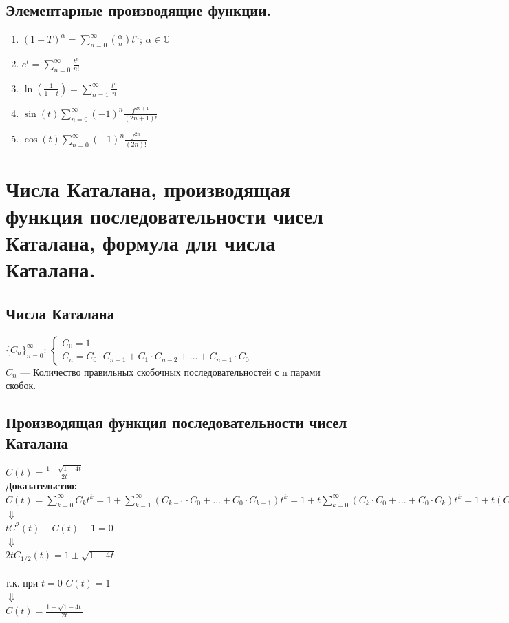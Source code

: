 \documentclass[12pt]{article}
\begin{document}
\subsection{Элементарные производящие функции.}
	\begin{enumerate}
	\item $ \displaystyle  (1+T)^\alpha = \sum_{n=0}^\infty \binom{\alpha}{n} t^n$; \quad $\alpha \in \mathbb C$
	\item $ \displaystyle  e^t = \sum_{n=0}^\infty \frac{t^n}{n!} $
	\item $ \displaystyle \ln\left(\frac{1}{1-t}\right) = \sum_{n=1}^\infty \frac{t^n}{n} $
	\item $ \displaystyle  \sin(t) \sum_{n=0}^\infty (-1)^n \frac{f^{2n+1}}{(2n+1)!} $
	\item $ \displaystyle  \cos(t) \sum_{n=0}^\infty (-1)^n \frac{f^{2n}}{(2n)!} $
\end{enumerate}

\section{Числа Каталана, производящая функция последовательности чисел Каталана, формула для числа Каталана.}
\subsection{Числа Каталана}
	$\{C_n\}_{n=0}^\infty$:
	$\begin{cases}
			C_0 = 1\\
			C_n = C_0 \cdot C_{n-1} + C_1\cdot C_{n-2}+ \ldots +C_{n-1}\cdot C_0
		\end{cases}$\\
	$C_n$ — Количество правильных скобочных последовательностей с n парами скобок.\\
\subsection{Производящая функция последовательности чисел Каталана}
	$C(t) = \frac{1-\sqrt{1-4t}}{2t}$\\
	\textbf{Доказательство:}\\
		$C(t) = \displaystyle\sum_{k=0}^\infty C_k t^k = 1 + \sum_{k=1}^\infty(C_{k-1} \cdot C_0 + \ldots + C_0 \cdot C_{k-1})t^k =
		1 + t\sum_{k=0}^\infty(C_{k} \cdot C_0 + \ldots + C_0 \cdot C_{k})t^k = 1 + t(C(t))^2$\\
		$\Downarrow$\\
		$tC^2(t) - C(t) + 1 = 0$\\
		$\Downarrow$\\
		$2tC_{1/2}(t) = 1 \pm \sqrt{1-4t}$\\\\
		т.к. при $t = 0$ $C(t) = 1$\\
		$\Downarrow$\\
		$C(t) = \frac{1 - \sqrt{1-4t}}{2t}$\\
	\qedsymbol
\end{document}
